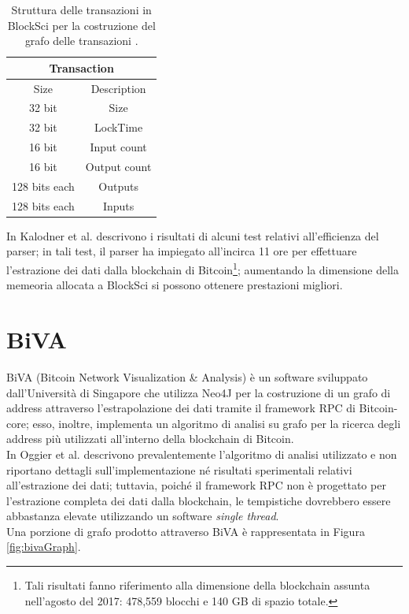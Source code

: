 \begin{table}
       \centering\small
           \begin{tabular}{|c|c|}
               \hline
                 \multicolumn{2}{|c|}{\textbf{Transaction}} \\
                 \hline
                 \multicolumn{1}{|c|}{Size} & \multicolumn{1}{c|}{Description} \\
               \hline \hline
               32 bit & Size   \\
               \hline
               32 bit & LockTime \\
               \hline
               16 bit & Input count \\
               \hline
               16 bit & Output count \\
               \hline
               128 bits each & ﻿Outputs \\
               \hline
               128 bits each & ﻿Inputs \\
               \hline
       \end{tabular}
       \caption{Struttura delle transazioni in BlockSci per la costruzione del grafo delle transazioni \cite{blocksci:article}.\label{tab:blockSciSerialization}}
   \end{table}

In  \cite{blocksci:article} Kalodner et al. descrivono i risultati di alcuni test relativi all'efficienza del parser; in tali test, il parser ha impiegato all'incirca 11 ore per effettuare l'estrazione dei dati dalla blockchain di Bitcoin\footnote{Tali risultati fanno riferimento alla dimensione della blockchain assunta nell'agosto del 2017: 478,559 blocchi e 140 GB di spazio totale.}; aumentando la dimensione della memeoria allocata a BlockSci si possono ottenere prestazioni migliori.

\section{BiVA} \label{sec:biva}

BiVA (Bitcoin Network Visualization \& Analysis) è un software sviluppato dall'Università di Singapore che utilizza Neo4J \cite{neo4j} per la costruzione di un grafo di address attraverso l'estrapolazione dei dati tramite il framework RPC di Bitcoin-core; esso, inoltre, implementa un algoritmo di analisi su grafo per la ricerca degli address più utilizzati all'interno della blockchain di Bitcoin.\\
In \cite{DBLP:conf/icdm/OggierPD18} Oggier et al. descrivono prevalentemente l'algoritmo di analisi utilizzato e non riportano dettagli sull'implementazione né risultati sperimentali relativi all'estrazione dei dati; tuttavia, poiché il framework RPC non è progettato  per l'estrazione completa dei dati dalla blockchain, le tempistiche dovrebbero essere abbastanza elevate utilizzando un software \emph{single thread}.\\
Una porzione di grafo prodotto attraverso BiVA è rappresentata in Figura \ref{fig:bivaGraph}.


